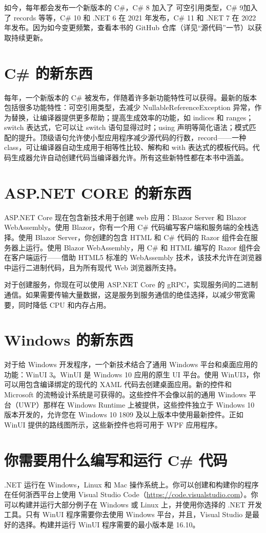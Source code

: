 如今，每年都会发布一个新版本的 C\#，C\# 8 加入了 可空引用类型，C\# 9加入了 records 等等，C\# 10 和 .NET 6 在 2021 年发布，C\# 11 和 .NET 7 在 2022 年发布。因为如今变更频繁，查看本书的 GitHub 仓库（详见“源代码”一节）以获取持续更新。

\section*{C\# 的新东西}
每年，一个新版本的 C\# 被发布，伴随着许多新功能特性可以获得。最新的版本包括很多功能特性：可空引用类型，去减少 NullableReferenceException 异常，作为替换，让编译器提供更多帮助；提高生成效率的功能，如 indices 和 ranges；switch 表达式，它可以让 switch 语句显得过时；using 声明等简化语法；模式匹配的提升。顶级语句允许使小型应用程序减少源代码的行数，record——一种 class，可让编译器自动生成用于相等性比较、解构和 with 表达式的模板代码。代码生成器允许自动创建代码当编译器允许。所有这些新特性都在本书中涵盖。

\section*{ASP.NET CORE 的新东西}
ASP.NET Core 现在包含新技术用于创建 web 应用：Blazor Server 和 Blazor WebAssembly。使用 Blazor，你有一个用 C\# 代码编写客户端和服务端的全栈选择。使用 Blazor Server，你创建的包含 HTML 和 C\# 代码的 Razor 组件会在服务器上运行。使用 Blazor WebAssembly，用 C\# 和 HTML 编写的 Razor 组件会在客户端运行——借助 HTML5 标准的 WebAssembly 技术，该技术允许在浏览器中运行二进制代码，且为所有现代 Web 浏览器所支持。

对于创建服务，你现在可以使用 ASP.NET Core 的 gRPC，实现服务间的二进制通信。如果需要传输大量数据，这是服务到服务通信的绝佳选择，以减少带宽需要，同时降低 CPU 和内存占用。

\section*{Windows 的新东西}
对于给 Windows 开发程序，一个新技术结合了通用 Windows 平台和桌面应用的功能：WinUI 3。WinUI 是 Windows 10 应用的原生 UI 平台。使用 WinUI3，你可以用包含编译绑定的现代的 XAML 代码去创建桌面应用。新的控件和 Microsoft 的流畅设计系统是可获得的。这些控件不会像以前的通用 Windows 平台（UWP）那样在 Windows Runtime 上被提供，这些控件独立于 Windows 10 版本开发的，允许您在 Windows 10 1809 及以上版本中使用最新控件。正如 WinUI 提供的路线图所示，这些新控件也将可用于 WPF 应用程序。

\section*{你需要用什么编写和运行 C\# 代码}
.NET 运行在 Windows，Linux 和 Mac 操作系统上。你可以创建和构建你的程序在任何浙西平台上使用 Visual Studio Code（\url{https://code.visualstudio.com}）。你可以构建并运行大部分例子在 Windows 或 Linux 上，并使用你选择的 .NET 开发工具。只有 WinUI 程序需要你去使用 Windows 平台，并且，Visual Studio 是最好的选择。构建并运行 WinUI 程序需要的最小版本是 16.10。

